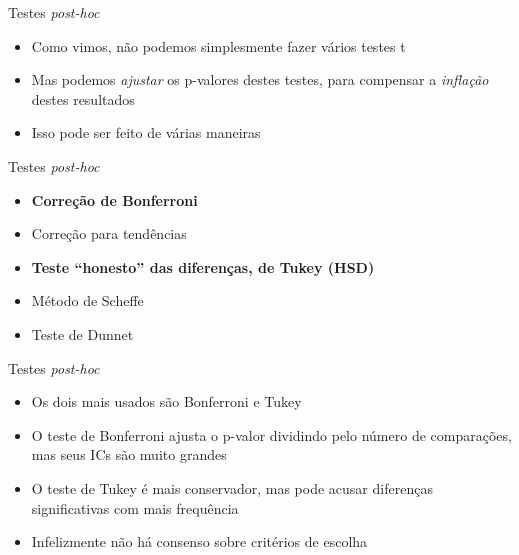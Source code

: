 \documentclass{beamer}
\begin{document}
\begin{frame}{Testes {\em post-hoc}}
  \begin{itemize}
  \item Como vimos, não podemos simplesmente fazer vários testes t
  \item Mas podemos {\em ajustar} os p-valores destes testes, para compensar a {\em inflação} destes resultados
  \item Isso pode ser feito de várias maneiras
  \end{itemize}
\end{frame}

\begin{frame}{Testes {\em post-hoc}}
  \begin{itemize}
  \item {\bf Correção de Bonferroni}
  \item Correção para tendências
  \item {\bf Teste ``honesto'' das diferenças, de Tukey (HSD)}
  \item Método de Scheffe
  \item Teste de Dunnet
  \end{itemize}
\end{frame}

\begin{frame}{Testes {\em post-hoc}}
  \begin{itemize}
  \item Os dois mais usados são Bonferroni e Tukey
 \item O teste de Bonferroni ajusta o p-valor dividindo pelo número de comparações, mas seus ICs são muito grandes
 \item O teste de Tukey é mais conservador, mas pode acusar diferenças significativas com mais frequência
 \item Infelizmente não há consenso sobre critérios de escolha
  \end{itemize}
\end{frame}
\end{document}
